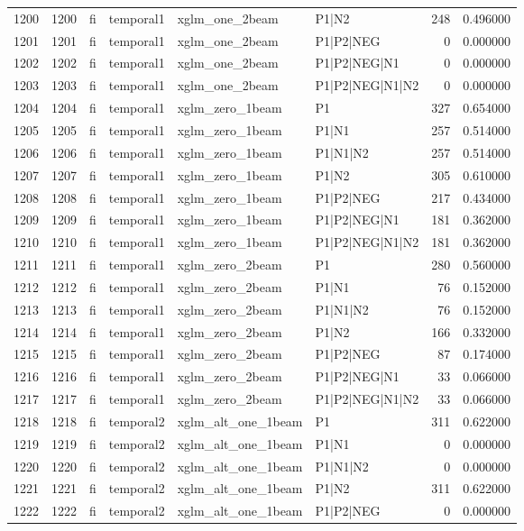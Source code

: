 \begin{tabular}{lrllllrr}
1200 & 1200 & fi & temporal1 & xglm_one_2beam & P1|N2 & 248 & 0.496000 \\
1201 & 1201 & fi & temporal1 & xglm_one_2beam & P1|P2|NEG & 0 & 0.000000 \\
1202 & 1202 & fi & temporal1 & xglm_one_2beam & P1|P2|NEG|N1 & 0 & 0.000000 \\
1203 & 1203 & fi & temporal1 & xglm_one_2beam & P1|P2|NEG|N1|N2 & 0 & 0.000000 \\
1204 & 1204 & fi & temporal1 & xglm_zero_1beam & P1 & 327 & 0.654000 \\
1205 & 1205 & fi & temporal1 & xglm_zero_1beam & P1|N1 & 257 & 0.514000 \\
1206 & 1206 & fi & temporal1 & xglm_zero_1beam & P1|N1|N2 & 257 & 0.514000 \\
1207 & 1207 & fi & temporal1 & xglm_zero_1beam & P1|N2 & 305 & 0.610000 \\
1208 & 1208 & fi & temporal1 & xglm_zero_1beam & P1|P2|NEG & 217 & 0.434000 \\
1209 & 1209 & fi & temporal1 & xglm_zero_1beam & P1|P2|NEG|N1 & 181 & 0.362000 \\
1210 & 1210 & fi & temporal1 & xglm_zero_1beam & P1|P2|NEG|N1|N2 & 181 & 0.362000 \\
1211 & 1211 & fi & temporal1 & xglm_zero_2beam & P1 & 280 & 0.560000 \\
1212 & 1212 & fi & temporal1 & xglm_zero_2beam & P1|N1 & 76 & 0.152000 \\
1213 & 1213 & fi & temporal1 & xglm_zero_2beam & P1|N1|N2 & 76 & 0.152000 \\
1214 & 1214 & fi & temporal1 & xglm_zero_2beam & P1|N2 & 166 & 0.332000 \\
1215 & 1215 & fi & temporal1 & xglm_zero_2beam & P1|P2|NEG & 87 & 0.174000 \\
1216 & 1216 & fi & temporal1 & xglm_zero_2beam & P1|P2|NEG|N1 & 33 & 0.066000 \\
1217 & 1217 & fi & temporal1 & xglm_zero_2beam & P1|P2|NEG|N1|N2 & 33 & 0.066000 \\
1218 & 1218 & fi & temporal2 & xglm_alt_one_1beam & P1 & 311 & 0.622000 \\
1219 & 1219 & fi & temporal2 & xglm_alt_one_1beam & P1|N1 & 0 & 0.000000 \\
1220 & 1220 & fi & temporal2 & xglm_alt_one_1beam & P1|N1|N2 & 0 & 0.000000 \\
1221 & 1221 & fi & temporal2 & xglm_alt_one_1beam & P1|N2 & 311 & 0.622000 \\
1222 & 1222 & fi & temporal2 & xglm_alt_one_1beam & P1|P2|NEG & 0 & 0.000000 \\

\end{tabular}
